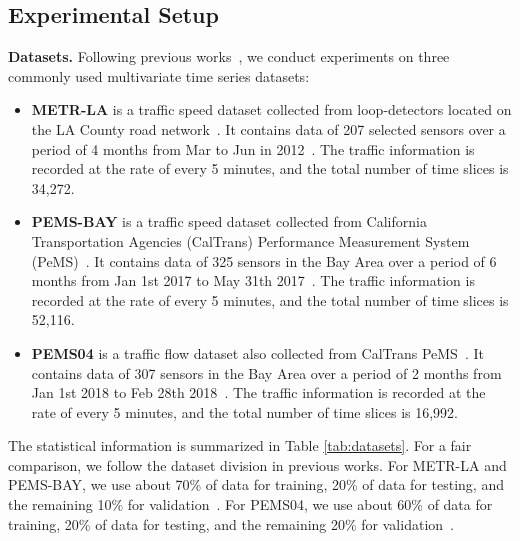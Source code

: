 \documentclass[sigconf]{acmart}
\begin{document}
\subsection{Experimental Setup}
\noindent\textbf{Datasets.}
Following previous works~\cite{2021GTS, 2020MTGNN, GWNet}, we conduct experiments on three commonly used multivariate time series datasets:
\begin{itemize}
    \item \textbf{METR-LA} is a traffic speed dataset collected from loop-detectors located on the LA County road network~\cite{METR-LA}. 
    It contains data of 207 selected sensors over a period of 4 months from Mar to Jun in 2012~\cite{2017DCRNN}. 
    The traffic information is recorded at the rate of every 5 minutes, and the total number of time slices is 34,272.
    \item \textbf{PEMS-BAY} is a traffic speed dataset collected from California Transportation Agencies (CalTrans) Performance Measurement System (PeMS)~\cite{PEMS-BAY}.
    It contains data of 325 sensors in the Bay Area over a period of 6 months from Jan 1st 2017 to May 31th 2017~\cite{2017DCRNN}.
    The traffic information is recorded at the rate of every 5 minutes, and the total number of time slices is 52,116.
    \item \textbf{PEMS04} is a traffic flow dataset also collected from CalTrans PeMS~\cite{PEMS-BAY}.
    It contains data of 307 sensors in the Bay Area over a period of 2 months from Jan 1st 2018 to Feb 28th 2018~\cite{2019ASTGCN}.
    The traffic information is recorded at the rate of every 5 minutes, and the total number of time slices is 16,992.
    
\end{itemize}
The statistical information is summarized in Table \ref{tab:datasets}.
For a fair comparison, we follow the dataset division in previous works.
For METR-LA and PEMS-BAY, we use about 70\% of data for training, 20\% of data for testing, and the remaining 10\% for validation~\cite{2017DCRNN, GWNet}.
For PEMS04, we use about 60\% of data for training, 20\% of data for testing, and the remaining 20\% for validation~\cite{2021ASTGNN, 2019ASTGCN}.
\end{document}
